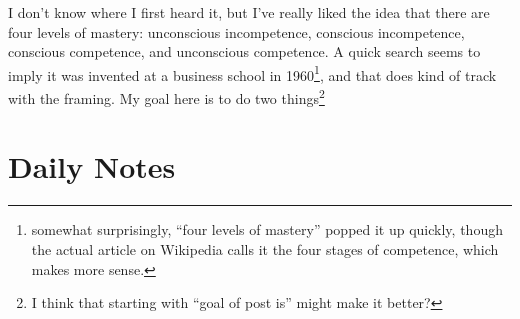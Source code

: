 \documentclass[12pt]{article}
\newcommand{\say}[1]{``#1''}
\renewcommand{\,}{\textsuperscript{,}}
\begin{document}
I don't know where I first heard it, but I've really liked the idea that there are four levels of mastery: unconscious incompetence, conscious incompetence, conscious competence, and unconscious competence.  
A quick search seems to imply it was invented at a business school in 1960\footnote{somewhat surprisingly, \say{four levels of mastery} popped it up quickly, though the actual article on Wikipedia calls it the four stages of competence, which makes more sense.}, and that does kind of track with the framing.  
My goal here is to do two things\footnote{I think that starting with \say{goal of post is} might make it better?}

\section{Daily Notes}
\end{document}
